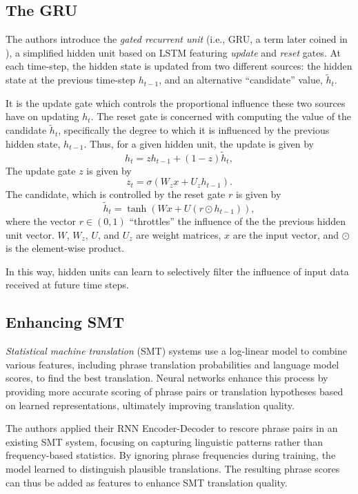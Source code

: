 \documentclass[10pt]{article}
\begin{document}
\subsection*{The GRU}
The authors introduce the \textit{gated recurrent unit} (i.e., GRU, a term later coined in \cite{gru}), a simplified hidden unit based on LSTM featuring \textit{update} and \textit{reset} gates. At each time-step, the hidden state is updated from two different sources: the hidden state at the previous time-step \(h_{t-1}\), and an alternative ``candidate'' value, \(\tilde{h}_t\).

It is the update gate which controls the proportional influence these two sources have on updating \(h_t\). The reset gate is concerned with computing the value of the candidate \(\tilde{h}_t\), specifically the degree to which it is influenced by the previous hidden state, \(h_{t-1}\). Thus, for a given hidden unit, the update is given by
\[
    h_t = z h_{t-1} + (1 - z) \tilde{h}_t,
\]
The update gate \(z\) is given by
\[
    z_t= \sigma(W_zx + U_zh_{t-1}).
\]
The candidate, which is controlled by the reset gate \(r\) is given by
\[
    \tilde{h}_t = \tanh(Wx + U(r \odot h_{t-1})),
\]
where the vector \(r \in (0, 1)\) ``throttles'' the influence of the the previous hidden unit vector. \(W\), \(W_z\), \(U\), and \(U_z\) are weight matrices, \(x\) are the input vector, and \(\odot\) is the element-wise product.

In this way, hidden units can learn to selectively filter the influence of input data received at future time steps.


\subsection*{Enhancing SMT}
\textit{Statistical machine translation} (SMT) systems use a log-linear model to combine various features, including phrase translation probabilities and language model scores, to find the best translation. Neural networks enhance this process by providing more accurate scoring of phrase pairs or translation hypotheses based on learned representations, ultimately improving translation quality.

The authors applied their RNN Encoder-Decoder to rescore phrase pairs in an existing SMT system, focusing on capturing linguistic patterns rather than frequency-based statistics. By ignoring phrase frequencies during training, the model learned to distinguish plausible translations. The resulting phrase scores can thus be added as features to enhance SMT translation quality.
\end{document}
